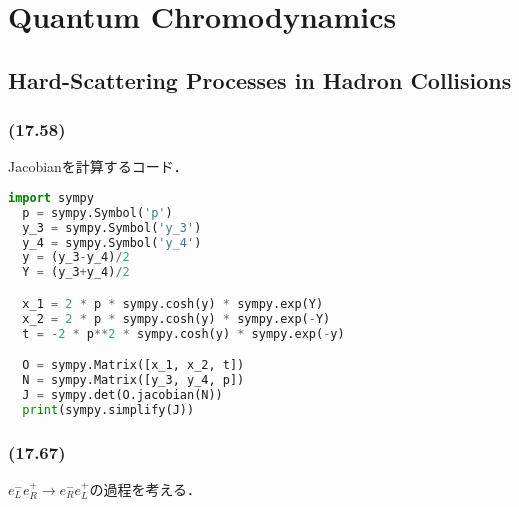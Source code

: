 \chapter{Quantum Chromodynamics}
\setcounter{section}{3}
\section{Hard-Scattering Processes in Hadron Collisions}
\subsection{(17.58)}
Jacobianを計算するコード．

\begin{lstlisting}[language=python]
  import sympy
  p = sympy.Symbol('p')
  y_3 = sympy.Symbol('y_3')
  y_4 = sympy.Symbol('y_4')
  y = (y_3-y_4)/2
  Y = (y_3+y_4)/2

  x_1 = 2 * p * sympy.cosh(y) * sympy.exp(Y)
  x_2 = 2 * p * sympy.cosh(y) * sympy.exp(-Y)
  t = -2 * p**2 * sympy.cosh(y) * sympy.exp(-y)

  O = sympy.Matrix([x_1, x_2, t])
  N = sympy.Matrix([y_3, y_4, p])
  J = sympy.det(O.jacobian(N))
  print(sympy.simplify(J))
\end{lstlisting}

\subsection{(17.67)}
$e_L^- e_R^+ \to e_R^- e^+_L$の過程を考える．

\begin{center}
\end{center}


